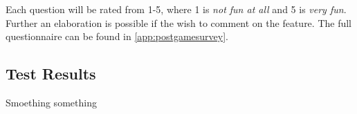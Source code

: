 Each question will be rated from 1-5, where 1 is \emph{not fun at all} and 5 is \emph{very fun}.
Further an elaboration is possible if the wish to comment on the feature.
The full questionnaire can be found in \ref{app:postgamesurvey}.

\subsection{Test Results}
Smoething something